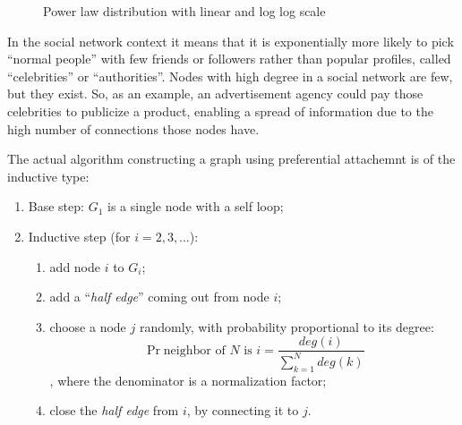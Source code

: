 \begin{figure}[ht]
    \centering
    \hskip 7pt
    \caption{Power law distribution with linear and log log scale}
    \label{fig:power-law}
\end{figure}

In the social network context it means that it is exponentially more likely to pick ``normal people'' with few friends or followers rather than popular profiles, called ``celebrities'' or ``authorities''. Nodes with high degree in a social network are few, but they exist. So, as an example, an advertisement agency could pay those celebrities to publicize a product, enabling a spread of information due to the high number of connections those nodes have.

The actual algorithm constructing a graph using preferential attachemnt is of the inductive type:
\begin{enumerate}
    \item Base step: $G_1$ is a single node with a self loop;
    \item Inductive step (for $i = 2, 3, \ldots$):
    \begin{enumerate}
        \item add node $i$ to $G_i$;
        \item add a ``\textit{half edge}'' coming out from node $i$;
        \item choose a node $j$ randomly, with probability proportional to its degree:
        \[
            \Pr{\text{neighbor of $N$ is $i$}} = \frac{deg(i)}{\sum_{k=1}^{N} deg(k)}
        \], where the denominator is a normalization factor;
        \item close the \textit{half edge} from $i$, by connecting it to $j$.
    \end{enumerate}
\end{enumerate}

